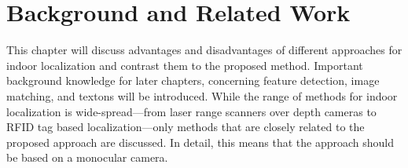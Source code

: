 \chapter{Background and Related Work}
\label{chap:relatedwork}

This chapter will discuss advantages and disadvantages of different approaches for indoor localization and
contrast them to the proposed method. Important
background knowledge for later chapters, concerning feature detection,
image matching, and textons will be introduced. While the range of methods for indoor localization is wide-spread---from laser range scanners over depth cameras to RFID tag based localization---only methods that are closely related to the proposed approach are discussed. In detail, this means that the approach should be based on a monocular camera.
